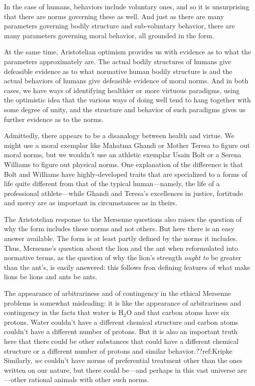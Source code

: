 In the case of humans, behaviors include voluntary ones, and so it is unsurprising that there are norms governing these
as well. And just as there are many parameters governing bodily structure and sub-voluntary behavior, there are many parameters
governing moral behavior, all grounded in the form. 

At the same time, Aristotelian optimism provides us with evidence as to what the parameters approximately are. The actual
bodily structures of humans give defeasible evidence as to what normative human bodily structure is and the actual behaviors
of humans give defeasible evidence of moral norms. And in both cases, we have ways of identifying healthier or more virtuous 
paradigms, using the optimistic idea that the various ways of doing well tend to hang together with some
degree of unity, and the structure and behavior of such paradigms gives us further evidence as to the norms.

Admittedly, there appears to be a disanalogy between health and virtue. We might use a moral exemplar 
like  Mahatma Ghandi or Mother Teresa to 
figure out moral norms, but we wouldn't use an athletic exemplar Usain Bolt or a Serena Williams to figure out physical norms. One explanation 
of the difference is that Bolt and Williams have highly-developed traits that are specialized to a forms of life quite
different from that of the typical human---namely, the life of a professional athlete---while Ghandi and Teresa's excellences in justice, fortitude and mercy are as important in circumstances as in theirs. 

The Aristotelian response to the Mersenne questions also raises the question of why the form includes these norms and not others. But here there is an easy 
answer available. The form is at least partly defined by the norms it includes. Thus, Mersenne's question about the lion and
the ant when reformulated into normative terms, as the question of why the lion's strength \textit{ought to} be greater
than the ant's, is easily answered: this follows fron defining features of what make lions be lions and ants be ants. 

The appearance of arbitrariness and of contingency in the ethical Mersenne problems is somewhat misleading: it is like the appearance of arbitrariness and
contingency in the facts that water is H$_2$O and that carbon atoms have six protons. Water couldn't have a different chemical
structure and carbon atoms couldn't have a different number of protons. But it is also an important truth  here that there 
could be other substances that could have a different chemical structure or a different number of protons and similar behavior.??ref:Kripke Similarly, \textit{we}
couldn't have norms of preferential treatment other than the ones written on our nature, but there could be---and perhaps in
this vast universe are---other rational animals with other such norms.

